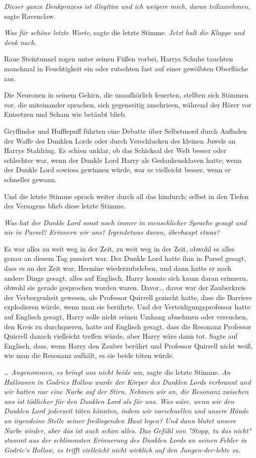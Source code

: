 {\emph{Dieser ganze Denkprozess ist illegitim und ich weigere mich, daran teilzunehmen,} sagte Ravenclaw.

\emph{Was für schöne letzte Worte,} sagte die letzte Stimme. \emph{Jetzt halt die Klappe und denk nach.}

Raue Steintunnel zogen unter seinen Füßen vorbei, Harrys Schuhe tauchten manchmal in Feuchtigkeit ein oder rutschten fast auf einer gewölbten Oberfläche aus.

Die Neuronen in seinem Gehirn, die unaufhörlich feuerten, stellten sich Stimmen vor, die miteinander sprachen, sich gegenseitig anschrieen, während der Hörer vor Entsetzen und Scham wie betäubt blieb.

Gryffindor und Hufflepuff führten eine Debatte über Selbstmord durch Aufladen der Waffe des Dunklen Lords oder durch Verschlucken des kleinen Juwels an Harrys Stahlring. Es schien unklar, ob das Schicksal der Welt besser oder schlechter war, wenn der Dunkle Lord Harry als Gedankensklaven hatte; wenn der Dunkle Lord sowieso gewinnen würde, war es vielleicht besser, wenn er schneller gewann.

Und die letzte Stimme sprach weiter durch all das hindurch; selbst in den Tiefen des Versagens blieb diese letzte Stimme.

\emph{Was hat der Dunkle Lord sonst noch immer in menschlicher Sprache gesagt und nie in Parsel? Erinnern wir uns? Irgendetwas davon, überhaupt etwas?}

Es war alles zu weit weg in der Zeit, zu weit weg in der Zeit, obwohl es alles genau an diesem Tag passiert war. Der Dunkle Lord hatte ihm in Parsel gesagt, dass es an der Zeit war, Hermine wiederzubeleben, und dann hatte er noch andere Dinge gesagt, alles auf Englisch, Harry konnte sich kaum daran erinnern, obwohl sie gerade gesprochen worden waren. Davor… davor war der Zauberkreis der Verborgenheit gewesen, als Professor Quirrell gezischt hatte, dass die Barriere explodieren würde, wenn man sie berührte. Und der Verteidigungsprofessor hatte auf Englisch gesagt, Harry solle nicht seinen Umhang abnehmen oder versuchen, den Kreis zu durchqueren, hatte auf Englisch gesagt, dass die Resonanz Professor Quirrell danach vielleicht treffen würde, aber Harry wäre dann tot. Sagte auf Englisch, dass, wenn Harry den Zauber berührt und Professor Quirrell nicht weiß, wie man die Resonanz aufhält, es sie beide töten würde.

\emph{… Angenommen, es bringt uns nicht beide um,} sagte die letzte Stimme. \emph{An Halloween in Godrics Hollow wurde der Körper des Dunklen Lords verbrannt und wir hatten nur eine Narbe auf der Stirn. Nehmen wir an, die Resonanz zwischen uns ist tödlicher für den Dunklen Lord als für uns. Was wäre, wenn wir den Dunklen Lord jederzeit töten könnten, indem wir vorschnellen und unsere Hände an irgendeine Stelle seiner freiliegenden Haut legen? Und dann blutet unsere Narbe wieder, aber das ist auch schon alles. Das Gefühl von "Stopp, tu das nicht" stammt aus der schlimmsten Erinnerung des Dunklen Lords an seinen Fehler in Godric's Hollow, es trifft vielleicht nicht wirklich auf den Jungen-der-lebte zu.}

}

